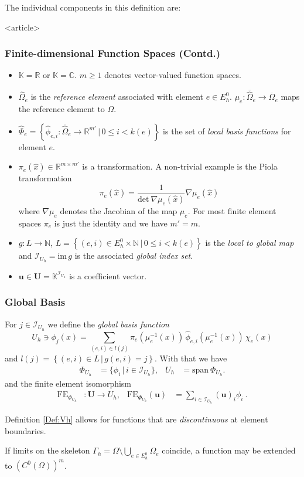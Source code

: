 The individual components in this definition are:
\begin{frame}<article>
\frametitle<presentation>{Finite-dimensional Function Spaces (Contd.)}
\begin{itemize}
\item $\mathbb{K}=\mathbb{R}$ or $\mathbb{K}=\mathbb{C}$.
  $m\geq 1$ denotes vector-valued function spaces. 
\item $\hat\Omega_e$ is the \textit{reference element} associated with
element $e\in E_h^0$. $\mu_e : \overline{\hat\Omega}_e \to
  \overline{\Omega}_e$ maps the reference element to $\Omega$.
\item $\hat\Phi_e
  = \left\{\hat\phi_{e,i}: \overline{\hat\Omega}_e \to \mathbb{R}^{m'}\,|\,0\leq
  i < k(e)\right\}$ is 
  the set of \textit{local basis functions} for element $e$.
\item $\pi_e(\hat{x})\in\mathbb{R}^{m\times m'}$ is a
  transformation. A non-trivial example is the Piola
  transformation \cite{BrezziFortin}
\begin{equation*}
\pi_e(\hat{x}) = \frac{1}{\text{det}\  \nabla\mu_e(\hat{x})} \nabla \mu_e(\hat{x})
\end{equation*}
where $\nabla \mu_e$ denotes the Jacobian of the map $\mu_e$. For most
finite element spaces $\pi_e$ is just the identity and we have $m'=m$.
\item $g : L \to \mathbb{N}$, $L=\left\{ (e,i)\in E_h^0 \times
  \mathbb{N} \,|\, 0\leq i < k(e)\right\}$ is the \textit{local to global map}
  and $\mathcal{I}_{U_h} = \text{im}\,g$ is the associated \textit{global index set}.
\item $\mathbf{u}\in \mathbf{U}=\mathbb{K}^{\mathcal{I}_{U_h}}$ is a coefficient vector.
\end{itemize}
\end{frame}

\begin{frame}
\frametitle<presentation>{Global Basis}
For $j\in \mathcal{I}_{U_h}$ we define the \textit{global basis function}
\begin{equation*}
U_h \ni \phi_j(x) = \sum_{(e,i)\in l(j)} \pi_e(\mu_e^{-1}(x)) \,
\hat\phi_{e,i}(\mu_e^{-1}(x)) \, \chi_e(x)
\end{equation*} 
and $l(j) = \left\{ (e,i)\in L \,|\, g(e,i)=j \right\}$.
With that we have
\begin{align}
\Phi_{U_h} &= \{\phi_i \,|\, i\in \mathcal{I}_{U_h}\}, & U_h &= \text{span}\ \Phi_{U_h}.
\end{align}
and the finite element isomorphism
\begin{align}\label{Eq:FiniteElementIsomorphism}
\text{FE}_{\Phi_{U_h}} &: \mathbf{U} \to
U_h, & \text{FE}_{\Phi_{U_h}}(\mathbf{u})
&= \sum_{i\in\mathcal{I}_{U_h}} (\mathbf{u})_i \phi_i \ . 
\end{align} 

Definition \ref{Def:Vh} allows for functions that are
\textit{discontinuous} at element boundaries. 

If limits on the skeleton $\Gamma_h = \Omega\setminus \bigcup_ {e\in
  E_h^0} \Omega_e$ coincide, a function may be extended to 
$\left(C^0(\Omega)\right)^m$.
\end{frame}

